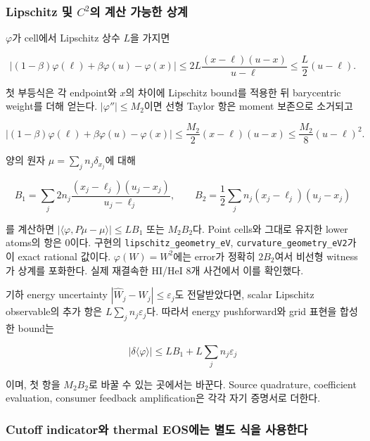 \hypertarget{lipschitz-uxbc0f-c2uxc758-uxacc4uxc0b0-uxac00uxb2a5uxd55c-uxc0c1uxacc4}{%
\subsubsection{\texorpdfstring{Lipschitz 및 \(C^2\)의 계산 가능한 상계}{Lipschitz 및 C\^{}2의 계산 가능한 상계}}\label{lipschitz-uxbc0f-c2uxc758-uxacc4uxc0b0-uxac00uxb2a5uxd55c-uxc0c1uxacc4}}

\(\varphi\)가 cell에서 Lipschitz 상수 \(L\)을 가지면

\[
 \left|(1-\beta)\varphi(\ell)+\beta\varphi(u)-\varphi(x)\right|
 \le 2L\frac{(x-\ell)(u-x)}{u-\ell}
 \le\frac L2(u-\ell).
\tag{GR.18}
\]

첫 부등식은 각 endpoint와 \(x\)의 차이에 Lipschitz bound를 적용한 뒤 barycentric weight를 더해 얻는다. \(|\varphi''|\le M_2\)이면 선형 Taylor 항은 moment 보존으로 소거되고

\[
 \left|(1-\beta)\varphi(\ell)+\beta\varphi(u)-\varphi(x)\right|
 \le\frac{M_2}{2}(x-\ell)(u-x)
 \le\frac{M_2}{8}(u-\ell)^2.
\tag{GR.19}
\]

양의 원자 \(\mu=\sum_j n_j\delta_{x_j}\)에 대해

\[
 B_1=\sum_j2n_j\frac{(x_j-\ell_j)(u_j-x_j)}{u_j-\ell_j},\qquad
 B_2=\frac12\sum_jn_j(x_j-\ell_j)(u_j-x_j)
\tag{GR.20}
\]

를 계산하면 \(|\langle\varphi,P\mu-\mu\rangle|\le LB_1\) 또는 \(M_2B_2\)다. Point cells와 그대로 유지한 lower atoms의 항은 0이다. 구현의 \texttt{lipschitz\_geometry\_eV}, \texttt{curvature\_geometry\_eV2}가 이 exact rational 값이다. \(\varphi(W)=W^2\)에는 error가 정확히 \(2B_2\)여서 비선형 witness가 상계를 포화한다. 실제 재결속한 HI/HeI 8개 사건에서 이를 확인했다.

기하 energy uncertainty \(|\widehat W_j-W_j|\le\varepsilon_j\)도 전달받았다면, scalar Lipschitz observable의 추가 항은 \(L\sum_jn_j\varepsilon_j\)다. 따라서 energy pushforward와 grid 표현을 합성한 bound는

\[
 |\delta\langle\varphi\rangle|
 \le LB_1+L\sum_jn_j\varepsilon_j
\tag{GR.21}
\]

이며, 첫 항을 \(M_2B_2\)로 바꿀 수 있는 곳에서는 바꾼다. Source quadrature, coefficient evaluation, consumer feedback amplification은 각각 자기 증명서로 더한다.

\hypertarget{cutoff-indicatoruxc640-thermal-eosuxc5d0uxb294-uxbcc4uxb3c4-uxc2dduxc744-uxc0acuxc6a9uxd55cuxb2e4}{%
\subsubsection{Cutoff indicator와 thermal EOS에는 별도 식을 사용한다}\label{cutoff-indicatoruxc640-thermal-eosuxc5d0uxb294-uxbcc4uxb3c4-uxc2dduxc744-uxc0acuxc6a9uxd55cuxb2e4}}

